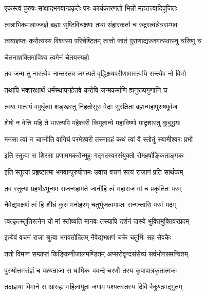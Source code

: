 
\twolineshloka
{एकस्त्वं पुरुषः साक्षाद्भगवान्प्रकृतेः परः}
{कार्यकारणतो भिन्नो महत्तत्त्वादिपूजितः}%

\twolineshloka
{त्वन्नाभिकमलाज्जज्ञे ब्रह्मा सृष्टिविचक्षणः}
{तथा संहारकर्ता च रुद्रस्त्वन्नेत्रसम्भवः}%

\twolineshloka
{त्वयाज्ञप्तः करोत्यस्य विश्वस्य परिचेष्टितम्}
{त्वत्तो जातं पुराणाद्यज्जगत्स्थास्नु चरिष्णु च}%

चेतनाशक्तिमाविश्य त्वमेनं चेतयस्यहो

\twolineshloka
{तव जन्म तु नास्त्येव नान्तस्तव जगत्पते}
{वृद्धिक्षयपरीणामास्त्वयि सन्त्येव नो विभो}%

\twolineshloka
{तथापि भक्तरक्षार्थं धर्मस्थापनहेतवे}
{करोषि जन्मकर्माणि ह्यनुरूपगुणानि च}%

\twolineshloka
{त्वया मात्स्यं वपुर्धृत्वा शङ्खस्तु निहतोसुरः}
{वेदाः सुरक्षिता ब्रह्मन्महापुरुषपूर्वज}%

\twolineshloka
{शेषो न वेत्ति महि ते भारत्यपि महेश्वरी}
{किमुतान्ये महाविष्णो मादृशास्तु कुबुद्धयः}%

\twolineshloka
{मनसा त्वां न चाप्नोति वागियं परमेश्वरी}
{तस्मादहं कथं त्वां वै स्तोतुं स्यामीश्वरः प्रभो}%

\twolineshloka
{इति स्तुत्वा स शिरसा प्रणाममकरोन्मुहुः}
{गद्गदस्वरसंयुक्तो रोमहर्षाङ्किताङ्गकः}%

\twolineshloka
{इति स्तुत्या प्रहृष्टात्मा भगवान्पुरुषोत्तमः}
{उवाच वचनं सत्यं राजानं प्रति सार्थकम्}%


\twolineshloka
{तव स्तुत्या प्रहर्षोऽभून्मम राजन्महामते}
{जानीहि त्वं महाराज मां च प्रकृतितः परम्}%

\twolineshloka
{नैवेद्यभक्षणं त्वं हि शीघ्रं कुरु मनोहरम्}
{चतुर्भुजत्वमाप्तः सन्गन्तासि परमं पदम्}%

\twolineshloka
{त्वत्कृत्स्तुतिरत्नेन यो मां स्तोष्यति मानवः}
{तस्यापि दर्शनं दास्ये भुक्तिमुक्तिवरप्रदम्}%

\twolineshloka
{इत्येवं वचनं राजा श्रुत्वा भगवतोदितम्}
{नैवेद्यभक्षणं चक्रे चतुर्भिः सह सेवकैः}%

\twolineshloka
{ततो विमानं सम्प्राप्तं किङ्किणीजालमण्डितम्}
{अप्सरोवृन्दसंसेव्यं सर्वभोगसमन्वितम्}%

\twolineshloka
{पुरुषोत्तमसंज्ञं च पश्यन्राजा स धार्मिकः}
{ववन्दे चरणौ तस्य कृपापात्रकृतात्मकः}%

\twolineshloka
{तदाज्ञया विमाने स आरुह्य महिलायुतः}
{जगाम पश्यतस्तस्य दिवि वैकुण्ठमद्भुतम्}%

